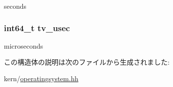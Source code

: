 seconds \hypertarget{structOperatingSystem_1_1timeval_a73863c3643de3f79fefa8b4d6d3cfaa8}{
\subsubsection[{tv\_\-usec}]{\setlength{\rightskip}{0pt plus 5cm}int64\_\-t {\bf tv\_\-usec}}}
\label{structOperatingSystem_1_1timeval_a73863c3643de3f79fefa8b4d6d3cfaa8}


microseconds 

この構造体の説明は次のファイルから生成されました:\begin{DoxyCompactItemize}
\item 
kern/\hyperlink{operatingsystem_8hh}{operatingsystem.hh}\end{DoxyCompactItemize}
